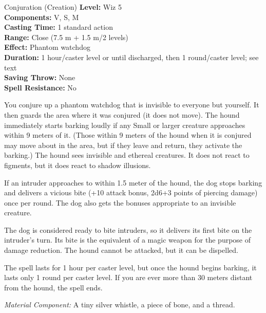 {Conjuration (Creation)}
{
	\textbf{Level:}
	Wiz 5\\
	\textbf{Components:}
	V, S, M\\
	\textbf{Casting Time:}
	1 standard action\\
	\textbf{Range:}
	Close (7.5 m + 1.5 m/2 levels)\\
	\textbf{Effect:}
	Phantom watchdog\\
	\textbf{Duration:}
	1 hour/caster level or until discharged, then 1 round/caster level; see text\\
	\textbf{Saving Throw:}
	None\\
	\textbf{Spell Resistance:}
	No\\
}
{
	You conjure up a phantom watchdog that is invisible to everyone but yourself. It then guards the area where it was conjured (it does not move). The hound immediately starts barking loudly if any Small or larger creature approaches within 9 meters of it. (Those within 9 meters of the hound when it is conjured may move about in the area, but if they leave and return, they activate the barking.) The hound sees invisible and ethereal creatures. It does not react to figments, but it does react to shadow illusions.

	If an intruder approaches to within 1.5 meter of the hound, the dog stops barking and delivers a vicious bite (+10 attack bonus, 2d6+3 points of piercing damage) once per round. The dog also gets the bonuses appropriate to an invisible creature.

	The dog is considered ready to bite intruders, so it delivers its first bite on the intruder's turn. Its bite is the equivalent of a magic weapon for the purpose of damage reduction. The hound cannot be attacked, but it can be dispelled.

	The spell lasts for 1 hour per caster level, but once the hound begins barking, it lasts only 1 round per caster level. If you are ever more than 30 meters distant from the hound, the spell ends.

	\textit{Material Component:}
	A tiny silver whistle, a piece of bone, and a thread.

}
